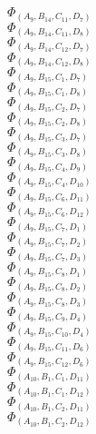 \documentclass[14pt]{article}
\begin{document}
    $\Phi_{({A}_{9}, {B}_{14}, {C}_{11}, {D}_{7})}$ \\ 
    $\Phi_{({A}_{9}, {B}_{14}, {C}_{11}, {D}_{8})}$ \\ 
    $\Phi_{({A}_{9}, {B}_{14}, {C}_{12}, {D}_{7})}$ \\ 
    $\Phi_{({A}_{9}, {B}_{14}, {C}_{12}, {D}_{8})}$ \\ 
    $\Phi_{({A}_{9}, {B}_{15}, {C}_{1}, {D}_{7})}$ \\ 
    $\Phi_{({A}_{9}, {B}_{15}, {C}_{1}, {D}_{8})}$ \\ 
    $\Phi_{({A}_{9}, {B}_{15}, {C}_{2}, {D}_{7})}$ \\ 
    $\Phi_{({A}_{9}, {B}_{15}, {C}_{2}, {D}_{8})}$ \\ 
    $\Phi_{({A}_{9}, {B}_{15}, {C}_{3}, {D}_{7})}$ \\ 
    $\Phi_{({A}_{9}, {B}_{15}, {C}_{3}, {D}_{8})}$ \\ 
    $\Phi_{({A}_{9}, {B}_{15}, {C}_{4}, {D}_{9})}$ \\ 
    $\Phi_{({A}_{9}, {B}_{15}, {C}_{4}, {D}_{10})}$ \\ 
    $\Phi_{({A}_{9}, {B}_{15}, {C}_{6}, {D}_{11})}$ \\ 
    $\Phi_{({A}_{9}, {B}_{15}, {C}_{6}, {D}_{12})}$ \\ 
    $\Phi_{({A}_{9}, {B}_{15}, {C}_{7}, {D}_{1})}$ \\ 
    $\Phi_{({A}_{9}, {B}_{15}, {C}_{7}, {D}_{2})}$ \\ 
    $\Phi_{({A}_{9}, {B}_{15}, {C}_{7}, {D}_{3})}$ \\ 
    $\Phi_{({A}_{9}, {B}_{15}, {C}_{8}, {D}_{1})}$ \\ 
    $\Phi_{({A}_{9}, {B}_{15}, {C}_{8}, {D}_{2})}$ \\ 
    $\Phi_{({A}_{9}, {B}_{15}, {C}_{8}, {D}_{3})}$ \\ 
    $\Phi_{({A}_{9}, {B}_{15}, {C}_{9}, {D}_{4})}$ \\ 
    $\Phi_{({A}_{9}, {B}_{15}, {C}_{10}, {D}_{4})}$ \\ 
    $\Phi_{({A}_{9}, {B}_{15}, {C}_{11}, {D}_{6})}$ \\ 
    $\Phi_{({A}_{9}, {B}_{15}, {C}_{12}, {D}_{6})}$ \\ 
    $\Phi_{({A}_{10}, {B}_{1}, {C}_{1}, {D}_{11})}$ \\ 
    $\Phi_{({A}_{10}, {B}_{1}, {C}_{1}, {D}_{12})}$ \\ 
    $\Phi_{({A}_{10}, {B}_{1}, {C}_{2}, {D}_{11})}$ \\ 
    $\Phi_{({A}_{10}, {B}_{1}, {C}_{2}, {D}_{12})}$ \\ 
\end{document}

